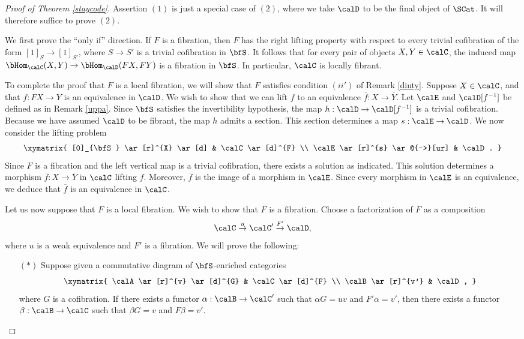 \begin{proof}[Proof of Theorem \ref{staycode}]
Assertion $(1)$ is just a special case of $(2)$, where we take $\calD$ to be the final object
of $\SCat$. It will therefore suffice to prove $(2)$. 

We first prove the ``only if'' direction.
If $F$ is a fibration, then $F$ has the right lifting property with respect to every
trivial cofibration of the form $[1]_{S} \rightarrow [1]_{S'}$, where $S \rightarrow S'$ is
a trivial cofibration in $\bfS$. It follows that for every pair of objects $X, Y \in \calC$, 
the induced map $\bHom_{\calC}(X,Y) \rightarrow \bHom_{\calD}(FX, FY)$ is a fibration in $\bfS$.
In particular, $\calC$ is locally fibrant.

To complete the proof that $F$ is a local fibration, we will show that $F$ satisfies condition $(ii')$ of Remark \ref{dinty}. Suppose $X \in \calC$, and that $f: FX \rightarrow Y$ is an equivalence in
$\calD$. We wish to show that we can lift $f$ to an equivalence
$\overline{f}: X \rightarrow \overline{Y}$. Let $\calE$ and $\calD[f^{-1}]$ be defined as
in Remark \ref{uppa}. 
Since $\bfS$ satisfies the invertibility hypothesis, the map $h: \calD \rightarrow \calD[f^{-1}]$
is a trivial cofibration. Because we have assumed $\calD$ to be fibrant, the map $h$
admits a section. This section determines a map $s: \calE \rightarrow \calD$.
We now consider the lifting problem
$$ \xymatrix{ [0]_{\bfS} \ar[r]^{X} \ar[d] & \calC \ar[d]^{F} \\
\calE \ar[r]^{s} \ar@{-->}[ur] & \calD. }$$
Since $F$ is a fibration and the left vertical map is a trivial cofibration, there
exists a solution as indicated. This solution determines a morphism
$\overline{f}: X \rightarrow \overline{Y}$ in $\calC$ lifting $f$.
Moreover, $\overline{f}$ is the image of a morphism in $\calE$.
Since every morphism in $\calE$ is an equivalence, we deduce that
$\overline{f}$ is an equivalence in $\calC$.

Let us now suppose that $F$ is a local fibration. We wish to show that
$F$ is a fibration. Choose a factorization of $F$ as a composition
$$ \calC \stackrel{u}{\rightarrow} \calC' \stackrel{F'}{\rightarrow} \calD,$$
where $u$ is a weak equivalence and $F'$ is a fibration. We will prove the following:

\begin{itemize}
\item[$(\ast)$] Suppose given a commutative diagram of $\bfS$-enriched categories
$$ \xymatrix{ \calA \ar[r]^{v} \ar[d]^{G} & \calC \ar[d]^{F} \\
\calB \ar[r]^{v'} & \calD, }$$
where $G$ is a cofibration. If there exists a functor $\alpha: \calB \rightarrow \calC'$ such
that $\alpha G = u v$ and $F' \alpha = v'$, then there exists a functor $\beta: \calB \rightarrow \calC$
such that $\beta G = v$ and $F \beta = v'$. 
\end{itemize}


\end{proof}
